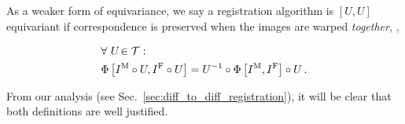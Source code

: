 As a weaker form of equivariance, we say a  registration algorithm is \textcolor{green!25!black}{$[U, U]$ equivariant} if correspondence is preserved when the images are warped \emph{together}, \ie,
\begin{tcolorbox}[top=-2mm,bottom=0mm,boxsep=1mm,colback=green!5!white,colframe=green!25!black]
	\begin{align}
		& \forall\ U \!\in \mathcal{T}: \label{eqn:UUequiv}  \\
        & \Phi\left[{I^\text{M}} \circ U, {I^\text{F}} \circ U\right] = U^{-1} \circ \Phi\left[{I^\text{M}}, {I^\text{F}}\right] \circ U\,. \notag
	\end{align}
\end{tcolorbox}
\noindent
From our analysis (see Sec.~\ref{sec:diff_to_diff_registration}), it will be clear that both definitions are well justified.

%
%
%
%
%
%
%
\vspace{-0.1cm}
